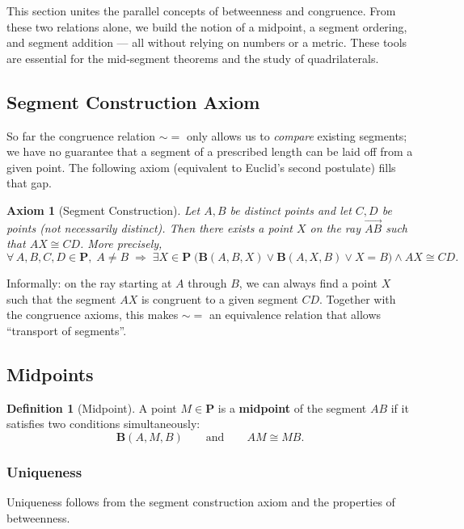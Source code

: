 \documentclass[12pt, letterpaper]{article}
\newtheorem{axiom}{Axiom}
\theoremstyle{definition}
\newtheorem{definition}[theorem]{Definition}
\newcommand{\ray}[1]{\overrightarrow{#1}}
\begin{document}
This section unites the parallel concepts of betweenness and congruence. From these two relations alone, we build the notion of a midpoint, a segment ordering, and segment addition — all without relying on numbers or a metric. These tools are essential for the mid‑segment theorems and the study of quadrilaterals.

\subsection{Segment Construction Axiom}
So far the congruence relation $\sim=$ only allows us to \emph{compare} existing segments; we have no guarantee that a segment of a prescribed length can be laid off from a given point. The following axiom (equivalent to Euclid's second postulate) fills that gap.

\begin{axiom}[Segment Construction]\label{ax:segment-construction}
Let $A,B$ be distinct points and let $C,D$ be points (not necessarily distinct). Then there exists a point $X$ on the ray $\ray{AB}$ such that $AX \cong CD$. More precisely,
\[
\forall\,A,B,C,D\in\mathbf{P},\; A\neq B \;\Longrightarrow\; \exists X\in\mathbf{P}\; \bigl( \mathbf{B}(A,B,X) \lor \mathbf{B}(A,X,B) \lor X=B \bigr) \land AX \cong CD .
\]
\end{axiom}

Informally: on the ray starting at $A$ through $B$, we can always find a point $X$ such that the segment $AX$ is congruent to a given segment $CD$. Together with the congruence axioms, this makes $\sim=$ an equivalence relation that allows “transport of segments”.

\subsection{Midpoints}
\begin{definition}[Midpoint]
A point $M\in\mathbf{P}$ is a \textbf{midpoint} of the segment $AB$ if it satisfies two conditions simultaneously:
\[
\mathbf{B}(A,M,B) \qquad\text{and}\qquad AM \cong MB .
\]
\end{definition}

\subsubsection{Uniqueness}
Uniqueness follows from the segment construction axiom and the properties of betweenness.
\end{document}
